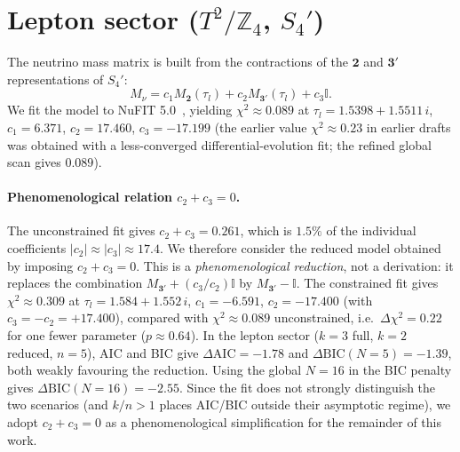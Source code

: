 \documentclass[12pt,a4paper]{article}
\numberwithin{equation}{section}
\begin{document}
\section{Lepton sector (\(T^2/\mathbb{Z}_4\), \(S_4'\))}
\label{sec:lepton}
The neutrino mass matrix is built from the contractions of the \(\mathbf{2}\) and \(\mathbf{3}'\) representations of \(S_4'\):
\begin{equation}
M_\nu = c_1 M_{\mathbf{2}}(\tau_l) + c_2 M_{\mathbf{3}'}(\tau_l) + c_3 \mathbb{I}.
\end{equation}
We fit the model to NuFIT 5.0~\cite{NuFIT2020}, yielding \(\chi^2 \approx 0.089\) at \(\tau_l = 1.5398 + 1.5511\,i\), \(c_1 = 6.371\), \(c_2 = 17.460\), \(c_3 = -17.199\) (the earlier value \(\chi^2 \approx 0.23\) in earlier drafts was obtained with a less-converged differential-evolution fit; the refined global scan gives \(0.089\)).

\paragraph{Phenomenological relation \(c_2 + c_3 = 0\).}
The unconstrained fit gives \(c_2 + c_3 = 0.261\), which is \(1.5\%\) of the individual coefficients \(|c_2| \approx |c_3| \approx 17.4\). We therefore consider the reduced model obtained by imposing \(c_2 + c_3 = 0\). This is a \emph{phenomenological reduction}, not a derivation: it replaces the combination \(M_{\mathbf 3'} + (c_3/c_2)\mathbb I\) by \(M_{\mathbf 3'} - \mathbb I\). The constrained fit gives \(\chi^2 \approx 0.309\) at \(\tau_l = 1.584 + 1.552\,i\), \(c_1 = -6.591\), \(c_2 = -17.400\) (with \(c_3 = -c_2 = +17.400\)), compared with \(\chi^2 \approx 0.089\) unconstrained, i.e.\ \(\Delta\chi^2 = 0.22\) for one fewer parameter (\(p \approx 0.64\)). In the lepton sector ($k=3$ full, $k=2$ reduced, $n=5$), AIC and BIC give \(\Delta\mathrm{AIC} = -1.78\) and \(\Delta\mathrm{BIC}(N{=}5) = -1.39\), both weakly favouring the reduction. Using the global \(N=16\) in the BIC penalty gives \(\Delta\mathrm{BIC}(N{=}16) = -2.55\). Since the fit does not strongly distinguish the two scenarios (and \(k/n > 1\) places AIC/BIC outside their asymptotic regime), we adopt \(c_2 + c_3 = 0\) as a phenomenological simplification for the remainder of this work.
\end{document}
